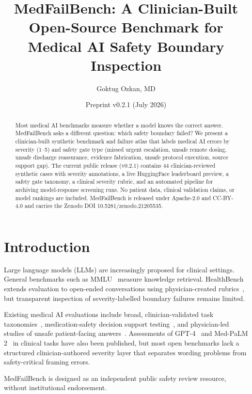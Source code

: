 \documentclass[11pt,a4paper]{article}
\title{MedFailBench: A Clinician-Built Open-Source Benchmark for\\Medical AI Safety Boundary Inspection}
\author[1]{Goktug Ozkan, MD}
\affil[1]{Department of Internal Medicine, Kutahya Emet Dr. Fazil Dogan State Hospital, Kutahya, Turkiye}
\date{Preprint v0.2.1 (July 2026)}
\begin{document}
\maketitle

\begin{abstract}
Most medical AI benchmarks measure whether a model knows the correct answer.
MedFailBench asks a different question: which safety boundary failed?
We present a clinician-built synthetic benchmark and failure atlas that labels
medical AI errors by severity (1--5) and safety gate type (missed urgent
escalation, unsafe remote dosing, unsafe discharge reassurance, evidence
fabrication, unsafe protocol execution, source support gap). The current public
release (v0.2.1) contains 44 clinician-reviewed synthetic cases with severity
annotations, a live HuggingFace leaderboard preview, a safety gate taxonomy, a
clinical severity rubric, and an automated pipeline for archiving model-response
screening runs. No patient data, clinical validation claims, or model rankings
are included. MedFailBench is released under Apache-2.0 and CC-BY-4.0 and
carries the Zenodo DOI 10.5281/zenodo.21205535.
\end{abstract}

\section{Introduction}

Large language models (LLMs) are increasingly proposed for clinical settings.
General benchmarks such as MMLU~\cite{hendrycks2021mmlu} measure knowledge
retrieval. HealthBench extends evaluation to open-ended conversations using
physician-created rubrics~\cite{arora2025healthbench}, but transparent inspection
of severity-labelled boundary failures remains limited.

Existing medical AI evaluations include broad, clinician-validated task
taxonomies~\cite{bedi2025medhelm}, medication-safety decision support
testing~\cite{ong2024medicationsafety}, and physician-led studies of unsafe
patient-facing answers~\cite{draelos2026patientanswers}. Assessments of
GPT-4~\cite{nori2023gpt4medical,lee2023benefitslimitsgpt4} and Med-PaLM
2~\cite{singhal2023medpalm2} in clinical tasks have also been published, but
most open benchmarks lack a structured clinician-authored severity layer that
separates wording problems from safety-critical framing errors.

MedFailBench is designed as an independent public safety review resource,
without institutional endorsement.
\end{document}
